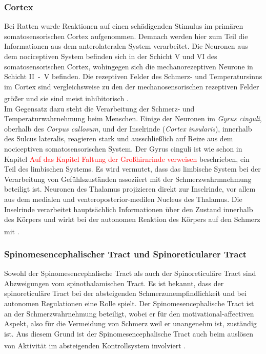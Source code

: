 \documentclass[12pt,a4paper,pdftex]{article}
\begin{document}
\subsubsection*{Cortex}
Bei Ratten wurde Reaktionen auf einen schädigenden Stimulus im primären somatosensorischen Cortex aufgenommen. Demnach werden hier zum Teil die Informationen aus dem anterolateralen System verarbeitet. Die Neuronen aus dem nociceptiven System befinden sich in der Schicht V und VI des somatosensorischen Cortex, wohingegen sich die mechanorezeptiven Neurone in Schicht II~-~V befinden. Die rezeptiven Felder des Schmerz- und Temperatursinns im Cortex sind vergleichsweise zu den der mechanosensorischen rezeptiven Felder größer und sie sind meist inhibitorisch \textsuperscript{\cite[25]{paxinos2014rat}}.
\\
\noindent Im Gegensatz dazu steht die Verarbeitung der Schmerz- und  Temperaturwahrnehmung beim Menschen. Einige der Neuronen im \textit{Gyrus cinguli}, oberhalb des \textit{Corpus callosum}, und der Inselrinde (\textit{Cortex insularis}), innerhalb des Sulcus lateralis, reagieren stark und ausschließlich auf Reize aus dem nociceptiven somatosensorischen System. Der Gyrus cinguli ist wie schon in Kapitel \textcolor{red}{Auf das Kapitel Faltung der Großhirnrinde verweisen} beschrieben, ein Teil des limbischen Systems. Es wird vermutet, dass das limbische System bei der Verarbeitung von Gefühlszuständen assoziiert mit der Schmerzwahrmnehmung beteiligt ist. Neuronen des Thalamus projizieren direkt zur Inselrinde, vor allem aus dem medialen und venteroposterior-medilen Nucleus des Thalamus. Die Inselrinde verarbeitet hauptsächlich Informationen über den Zustand innerhalb des Körpers und wirkt bei der autonomen Reaktion des Körpers auf den Schmerz mit \textsuperscript{\cite[24]{kandel2013principles}}.

\subsubsection*{Spinomesencephalischer Tract und  Spinoreticularer Tract}

Sowohl der Spinomesencephalische Tract  als auch der Spinoreticuläre Tract  sind Abzweigungen vom spinothalamischen Tract. Es ist bekannt, dass der spinoreticuläre Tract bei der absteigenden Schmerzunempfindlichkeit und bei autonomen Regulationen eine Rolle spielt. Der Spinomesencephalische Tract ist an der Schmerzwahrnehmung beteiligt, wobei er für den motivational-affectiven Aspekt, also für die Vermeidung von Schmerz weil er unangenehm ist, zuständig ist. Aus diesem Grund ist der Spinomesencephalische Tract auch beim auslösen von Aktivität im absteigenden Kontrollsystem involviert \textsuperscript{\cite[24]{kandel2013principles}}.
\end{document}
